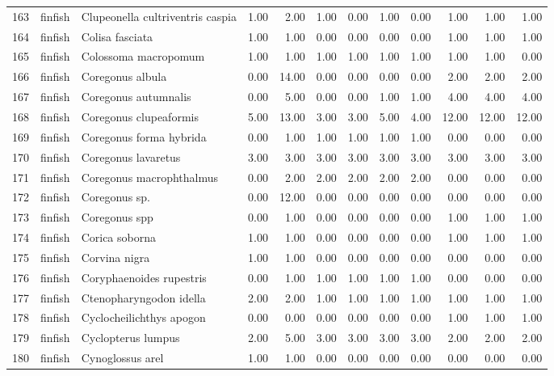 \begin{table}[ht]
\begin{tabular}{rllrrrrrrrrr}
  163 & finfish & Clupeonella cultriventris caspia & 1.00 & 2.00 & 1.00 & 0.00 & 1.00 & 0.00 & 1.00 & 1.00 & 1.00 \\ 
  164 & finfish & Colisa fasciata & 1.00 & 1.00 & 0.00 & 0.00 & 0.00 & 0.00 & 1.00 & 1.00 & 1.00 \\ 
  165 & finfish & Colossoma macropomum & 1.00 & 1.00 & 1.00 & 1.00 & 1.00 & 1.00 & 1.00 & 1.00 & 0.00 \\ 
  166 & finfish & Coregonus albula & 0.00 & 14.00 & 0.00 & 0.00 & 0.00 & 0.00 & 2.00 & 2.00 & 2.00 \\ 
  167 & finfish & Coregonus autumnalis & 0.00 & 5.00 & 0.00 & 0.00 & 1.00 & 1.00 & 4.00 & 4.00 & 4.00 \\ 
  168 & finfish & Coregonus clupeaformis & 5.00 & 13.00 & 3.00 & 3.00 & 5.00 & 4.00 & 12.00 & 12.00 & 12.00 \\ 
  169 & finfish & Coregonus forma hybrida & 0.00 & 1.00 & 1.00 & 1.00 & 1.00 & 1.00 & 0.00 & 0.00 & 0.00 \\ 
  170 & finfish & Coregonus lavaretus & 3.00 & 3.00 & 3.00 & 3.00 & 3.00 & 3.00 & 3.00 & 3.00 & 3.00 \\ 
  171 & finfish & Coregonus macrophthalmus & 0.00 & 2.00 & 2.00 & 2.00 & 2.00 & 2.00 & 0.00 & 0.00 & 0.00 \\ 
  172 & finfish & Coregonus sp. & 0.00 & 12.00 & 0.00 & 0.00 & 0.00 & 0.00 & 0.00 & 0.00 & 0.00 \\ 
  173 & finfish & Coregonus spp & 0.00 & 1.00 & 0.00 & 0.00 & 0.00 & 0.00 & 1.00 & 1.00 & 1.00 \\ 
  174 & finfish & Corica soborna & 1.00 & 1.00 & 0.00 & 0.00 & 0.00 & 0.00 & 1.00 & 1.00 & 1.00 \\ 
  175 & finfish & Corvina nigra & 1.00 & 1.00 & 0.00 & 0.00 & 0.00 & 0.00 & 0.00 & 0.00 & 0.00 \\ 
  176 & finfish & Coryphaenoides rupestris & 0.00 & 1.00 & 1.00 & 1.00 & 1.00 & 1.00 & 0.00 & 0.00 & 0.00 \\ 
  177 & finfish & Ctenopharyngodon idella & 2.00 & 2.00 & 1.00 & 1.00 & 1.00 & 1.00 & 1.00 & 1.00 & 1.00 \\ 
  178 & finfish & Cyclocheilichthys apogon & 0.00 & 0.00 & 0.00 & 0.00 & 0.00 & 0.00 & 1.00 & 1.00 & 1.00 \\ 
  179 & finfish & Cyclopterus lumpus & 2.00 & 5.00 & 3.00 & 3.00 & 3.00 & 3.00 & 2.00 & 2.00 & 2.00 \\ 
  180 & finfish & Cynoglossus arel & 1.00 & 1.00 & 0.00 & 0.00 & 0.00 & 0.00 & 0.00 & 0.00 & 0.00 \\ 

\end{tabular}
\end{table}
